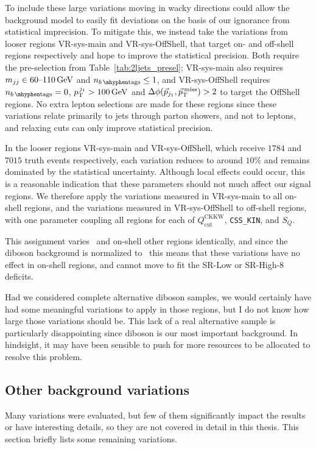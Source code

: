 To include these large variations moving in wacky directions could allow the
background model to easily fit deviations on the basis of our ignorance
from statistical imprecision.
To mitigate this, we instead take the variations from looser regions
VR-sys-main and VR-sys-OffShell, that target on- and off-shell regions
respectively and hope to improve the statistical precision.
Both require the pre-selection from Table~\ref{tab:2ljets_presel};
VR-sys-main also requires
$\mjj \in 60\textrm{--}110\,\eV[G]$ and $\nbtag \leq 1$,
and VR-sys-OffShell requires
$\nbtag = 0$, $\ptjone > 100\,\eV[G]$ and $\dphijmet > 2$ to target the
OffShell regions.
No extra lepton selections are made for these regions since these variations
relate primarily to jets through parton showers, and not to leptons, and
relaxing cuts can only improve statistical precision.

In the looser regions VR-sys-main and VR-sys-OffShell,
which receive $1784$ and $7015$ truth events respectively, each variation
reduces to around $10\%$ and remains dominated by the statistical uncertainty.
Although local effects could occur, this is a reasonable indication that these
parameters should not much affect our signal regions.
We therefore apply the variations measured in VR-sys-main to all on-shell
regions,
and the variations measured in VR-sys-OffShell to off-shell regions,
with one parameter coupling all regions for each of
$Q_\textrm{cut}^\textrm{CKKW}$,
\texttt{CSS\_KIN}, and
$S_Q$.

This assignment varies \crvz\ and on-shell other regions identically,
and since the diboson background is normalized to \crvz\ this means that
these variations have no effect in on-shell regions, and cannot move to
fit the SR-Low or SR-High-8 deficits.

Had we considered complete alternative diboson samples, we would certainly
have had some meaningful variations to apply in those regions, but I do not
know how large those variations should be.
This lack of a real alternative sample is particularly disappointing since
diboson is our most important background.
In hindsight, it may have been sensible to push for more resources to be
allocated to resolve this problem.

\subsection{Other background variations}
\label{sec:2ljets_other_background_variations}
Many variations were evaluated, but few of them significantly impact the
results or have interesting details, so they are not covered in detail in
this thesis.
This section briefly lists some remaining variations.

